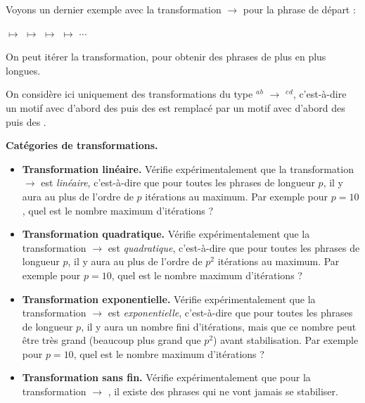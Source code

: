 \documentclass[12pt,class=report,crop=false]{standalone}
\begin{document}
\newpage

\begin{exemple}
Voyons un dernier exemple avec la transformation \rzero\run{} $\rightarrow$ \run\run\rzero\rzero{} pour la phrase de départ \rzero\rzero\rzero\run{}: \\
\centerline{
\rzero\rzero\rzero\run{} \quad $\longmapsto$ \quad 
\rzero\rzero\run\run\rzero\rzero{} \quad $\longmapsto$ \quad 
\rzero\run\run\rzero\rzero\run\rzero\rzero{} \quad $\longmapsto$ \quad 
\run\run\rzero\rzero\run\rzero\rzero\run\rzero\rzero{} \quad $\longmapsto$ \quad $\cdots$}

On peut itérer la transformation, pour obtenir des phrases de plus en plus longues.
\end{exemple}


\newpage

On considère ici uniquement des transformations du type \rzero$^a$\run$^b$ $\rightarrow$ \run$^c$\rzero$^d$, c'est-à-dire un motif avec d'abord des \rzero{} puis des \run{} est remplacé par un motif avec d'abord des \run{} puis des \rzero.

\bigskip
\bigskip

\textbf{Catégories de transformations.}
	
	\begin{itemize} 
	\item \textbf{Transformation linéaire.}
	Vérifie expérimentalement que la transformation \rzero\rzero\run\run{} $\rightarrow$ \run\run\rzero{} est \emph{linéaire}, c'est-à-dire que pour toutes les phrases de longueur $p$, il y aura au plus de l'ordre de $p$ itérations au maximum. Par exemple pour $p=10$, quel est le nombre maximum d'itérations  ?
	
	\item \textbf{Transformation quadratique.}
	Vérifie expérimentalement que la transformation \rzero\run{} $\rightarrow$ \run\rzero{} est \emph{quadratique}, c'est-à-dire que pour toutes les phrases de longueur $p$, il y aura au plus de l'ordre de $p^2$ itérations au maximum. Par exemple pour $p=10$, quel est le nombre maximum d'itérations  ?
	
	\item \textbf{Transformation exponentielle.}
	Vérifie expérimentalement que la transformation \rzero\run{} $\rightarrow$ \run\run\rzero{} est \emph{exponentielle}, c'est-à-dire que pour toutes les phrases de longueur $p$, il y aura un nombre fini d'itérations, mais que ce nombre peut être très grand (beaucoup plus grand que $p^2$) avant stabilisation. Par exemple pour $p=10$, quel est le nombre maximum d'itérations ?	

	\item \textbf{Transformation sans fin.}
	Vérifie expérimentalement que pour la transformation  \rzero\run{} $\rightarrow$ \run\run\rzero\rzero{}, il existe des phrases qui ne vont jamais se stabiliser.
	\end{itemize}
\end{document}
